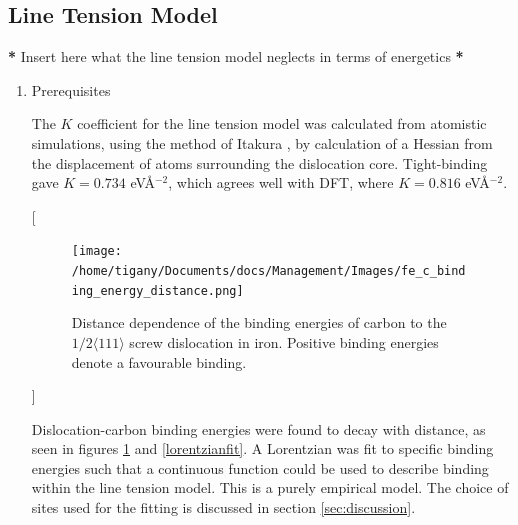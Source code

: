 \documentclass[a4paper,12pt,oneside,print,numbered,index,PageStyleIII]{PhDThesisPSnPDF}
\begin{document}
\subsection{Line Tension Model}
\label{sec:org1555547}
\label{sec:ltmodel}

\textbf{*} Insert here what the line tension model neglects in terms of energetics \textbf{*}
\begin{enumerate}
\item Prerequisites
\label{sec:orgdd565b8}

The \(K\) coefficient for the line tension model was calculated from atomistic simulations, using
the method of Itakura \cite{Itakura2012}, by calculation of a Hessian from the displacement of
atoms surrounding the dislocation core. Tight-binding gave \(K = 0.734\) eV\AA{}\(^{-2}\), which agrees well
with DFT, where \(K = 0.816\) eV\AA{}\(^{-2}\).


[\begin{figure}[htbp]
\centering
\texttt{[image: /home/tigany/Documents/docs/Management/Images/fe\_c\_binding\_energy\_distance.png]}
\caption{Distance dependence of the binding energies of carbon to the \(1/2\langle 111 \rangle\) screw dislocation in iron. Positive binding energies denote a favourable binding. \label{distancedep}}
\end{figure}]

Dislocation-carbon binding energies were found to decay with distance, as seen in figures
\ref{distancedep} and \ref{lorentzianfit}. A Lorentzian was fit to specific binding energies such
that a continuous function could be used to describe binding within
the line tension model. This is a purely empirical model. The
choice of sites used for the fitting is discussed in section
\ref{sec:discussion}.





\end{enumerate}
\end{document}
